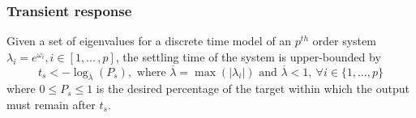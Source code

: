 \documentclass[sigconf]{llncs}
\begin{document}
\subsubsection{Transient response} 
\label{sec:transientspecificationproof}
\begin{theorem}
Given a set of eigenvalues for a discrete time model of an $p^{th}$ order system $\lambda_i =e^{\omega_i}, i \in [1, ...\,,p]$, the settling time of the system is upper-bounded by
\begin{equation}
t_s<-\log_{\overline{\lambda}}({P_s}), \text{ where }  \overline{\lambda} = \max(|\lambda_i|) \text{ and } \overline{\lambda}<1,\ \forall i \in \{1, \ldots,p\}
\label{eq:set_time}
\end{equation}
where $0\leq P_s \leq 1$ is the desired percentage of the target within which the output must remain after $t_s$.
\end{theorem}
\end{document}
